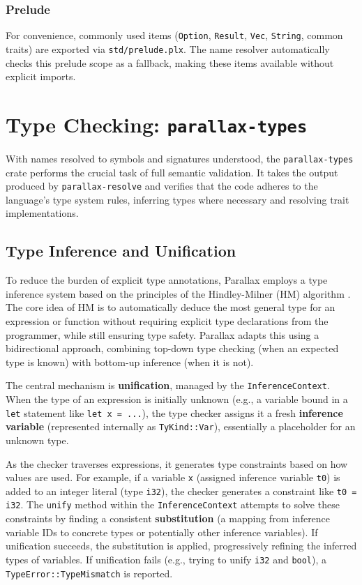 \subsubsection{Prelude}

For convenience, commonly used items (\texttt{Option}, \texttt{Result}, \texttt{Vec}, \texttt{String}, common traits) are exported via \texttt{std/prelude.plx}. The name resolver automatically checks this prelude scope as a fallback, making these items available without explicit imports.

\section{Type Checking: \texttt{parallax-types}}

With names resolved to symbols and signatures understood, the \texttt{parallax-types} crate performs the crucial task of full semantic validation. It takes the output produced by \texttt{parallax-resolve} and verifies that the code adheres to the language's type system rules, inferring types where necessary and resolving trait implementations.

\subsection{Type Inference and Unification}

To reduce the burden of explicit type annotations, Parallax employs a type inference system based on the principles of the Hindley-Milner (HM) algorithm \cite{Hindley1969}. The core idea of HM is to automatically deduce the most general type for an expression or function without requiring explicit type declarations from the programmer, while still ensuring type safety. Parallax adapts this using a bidirectional approach, combining top-down type checking (when an expected type is known) with bottom-up inference (when it is not).

The central mechanism is \textbf{unification}, managed by the \texttt{InferenceContext}. When the type of an expression is initially unknown (e.g., a variable bound in a \texttt{let} statement like \texttt{let x = ...}), the type checker assigns it a fresh \textbf{inference variable} (represented internally as \texttt{TyKind::Var}), essentially a placeholder for an unknown type.

As the checker traverses expressions, it generates type constraints based on how values are used. For example, if a variable \texttt{x} (assigned inference variable \texttt{t0}) is added to an integer literal (type \texttt{i32}), the checker generates a constraint like \texttt{t0 = i32}. The \texttt{unify} method within the \texttt{InferenceContext} attempts to solve these constraints by finding a consistent \textbf{substitution} (a mapping from inference variable IDs to concrete types or potentially other inference variables). If unification succeeds, the substitution is applied, progressively refining the inferred types of variables. If unification fails (e.g., trying to unify \texttt{i32} and \texttt{bool}), a \texttt{TypeError::TypeMismatch} is reported.

